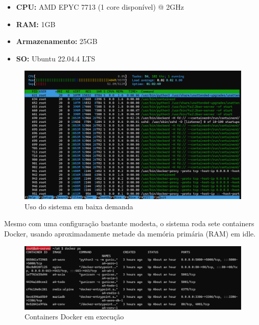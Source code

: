 \begin{itemize}
    \item \textbf{CPU:} AMD EPYC 7713 (1 core disponível) @ 2GHz
    \item \textbf{RAM:} 1GB
    \item \textbf{Armazenamento:} 25GB
    \item \textbf{SO:} Ubuntu 22.04.4 LTS
\end{itemize}

\begin{figure}[ht]
    \begin{center}
    \includegraphics[width=400pt]{img/prod-idle.png}
    \caption{Uso do sistema em baixa demanda}
    \label{fig:prod-idle}
    \end{center}
\end{figure}

Mesmo com uma configuração bastante modesta, o sistema roda sete containers Docker, usando 
aproximadamente metade da memória primária (RAM) em idle.

\begin{figure}[ht]
    \begin{center}
    \includegraphics[width=400pt]{img/containers.png}
    \caption{Containers Docker em execução}
    \label{fig:containers}
    \end{center}
\end{figure}

